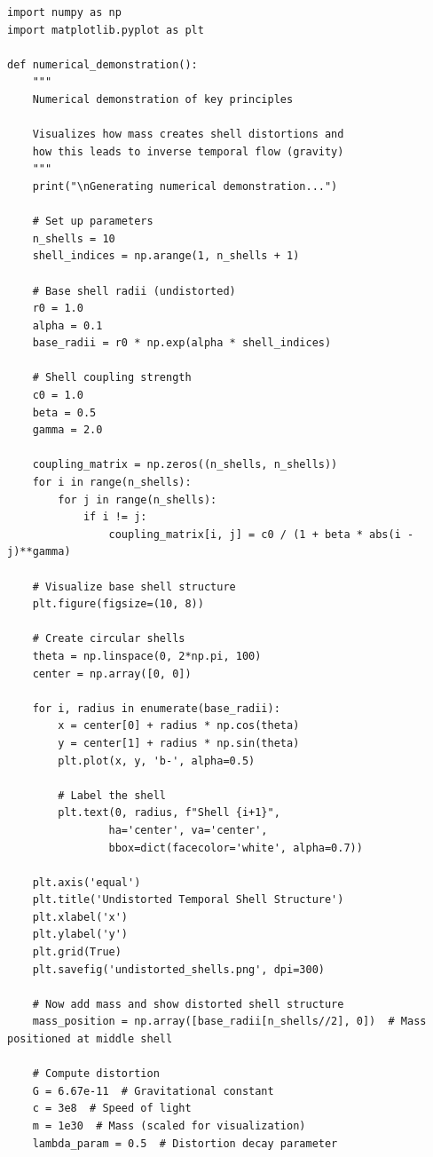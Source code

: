 \documentclass[12pt,a4paper]{article}
\begin{document}
\begin{lstlisting}[caption=Python implementation of numerical visualization of temporal shell distortion]
import numpy as np
import matplotlib.pyplot as plt

def numerical_demonstration():
    """
    Numerical demonstration of key principles
    
    Visualizes how mass creates shell distortions and
    how this leads to inverse temporal flow (gravity)
    """
    print("\nGenerating numerical demonstration...")
    
    # Set up parameters
    n_shells = 10
    shell_indices = np.arange(1, n_shells + 1)
    
    # Base shell radii (undistorted)
    r0 = 1.0
    alpha = 0.1
    base_radii = r0 * np.exp(alpha * shell_indices)
    
    # Shell coupling strength
    c0 = 1.0
    beta = 0.5
    gamma = 2.0
    
    coupling_matrix = np.zeros((n_shells, n_shells))
    for i in range(n_shells):
        for j in range(n_shells):
            if i != j:
                coupling_matrix[i, j] = c0 / (1 + beta * abs(i - j)**gamma)
    
    # Visualize base shell structure
    plt.figure(figsize=(10, 8))
    
    # Create circular shells
    theta = np.linspace(0, 2*np.pi, 100)
    center = np.array([0, 0])
    
    for i, radius in enumerate(base_radii):
        x = center[0] + radius * np.cos(theta)
        y = center[1] + radius * np.sin(theta)
        plt.plot(x, y, 'b-', alpha=0.5)
        
        # Label the shell
        plt.text(0, radius, f"Shell {i+1}", 
                ha='center', va='center', 
                bbox=dict(facecolor='white', alpha=0.7))
    
    plt.axis('equal')
    plt.title('Undistorted Temporal Shell Structure')
    plt.xlabel('x')
    plt.ylabel('y')
    plt.grid(True)
    plt.savefig('undistorted_shells.png', dpi=300)
    
    # Now add mass and show distorted shell structure
    mass_position = np.array([base_radii[n_shells//2], 0])  # Mass positioned at middle shell
    
    # Compute distortion
    G = 6.67e-11  # Gravitational constant
    c = 3e8  # Speed of light
    m = 1e30  # Mass (scaled for visualization)
    lambda_param = 0.5  # Distortion decay parameter
    

\end{lstlisting}
\end{document}
